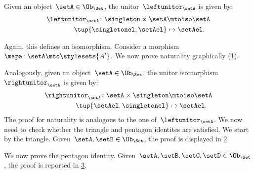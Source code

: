 \begin{example}
  Given an object~$\setA\in \Ob_\Set$, the unitor~$\leftunitor_\setA$ is given by:
  \begin{equation*}
      \label{eq:set_mon_prod_4}
    \begin{aligned}
      \leftunitor_\setA\colon \singleton \times \setA &\mtoiso \setA\\
      \tup{\singletonel,\setAel}&\mapsto \setAel.
    \end{aligned}
  \end{equation*}

  Again, this defines an isomorphism.
  Consider a morphism~$\mapa\colon \setA\mto \stylesets{A'}$.
  We now prove naturality graphically (\cref{fig:monoidal_set_unit_nat}).

  \begin{figure}[h!]
    \begin{center}
    \end{center}
    \caption{\label{fig:monoidal_set_unit_nat}}
  \end{figure}

  Analogously, given an object~$\setA\in \Ob_{\Set}$, the unitor isomorphism~$\rightunitor_\setA$ is given by:
  \begin{equation*}
      \label{eq:set_mon_prod_5}
    \begin{aligned}
      \rightunitor_\setA\colon \setA\times \singleton &\mtoiso \setA\\
      \tup{\setAel,\singletonel}&\mapsto \setAel.
    \end{aligned}
  \end{equation*}
  The proof for naturality is analogous to the one of~$\leftunitor_\setA$.
  We now need to check whether the triangle and pentagon identites are satisfied.
  We start by the triangle. Given~$\setA,\setB\in \Ob_{\Set}$, the proof is displayed in \cref{fig:set_mon_triangle}.

  \begin{figure}[h]
    \begin{center}
    \end{center}
    \caption{\label{fig:set_mon_triangle}}
  \end{figure}

  We now prove the pentagon identity. Given~$\setA,\setB,\setC,\setD\in \Ob_\Set$, the proof is reported in \cref{fig:set_mon_pent}.

  \begin{figure}[h]
    \begin{center}
    \end{center}
    \caption{\label{fig:set_mon_pent}}
  \end{figure}
\end{example}



